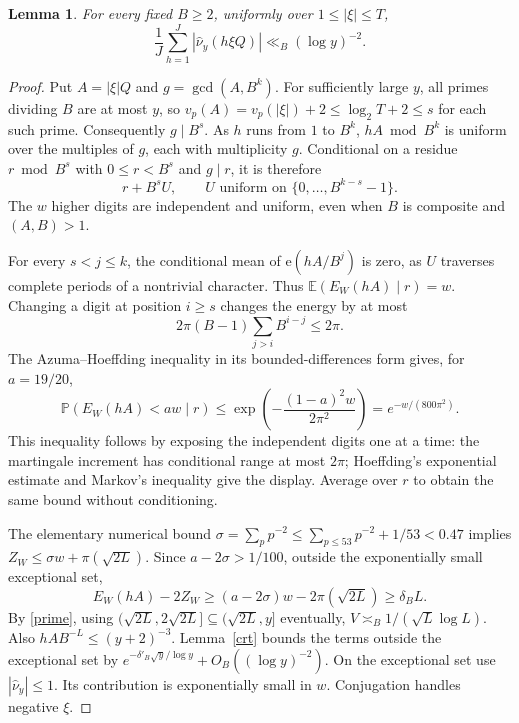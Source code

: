 \documentclass[11pt]{article}
\newtheorem{lemma}{Lemma}
\newcommand{\ee}{\mathrm e}
\newcommand{\E}{\mathbb E}
\newcommand{\PP}{\mathbb P}
\begin{document}
\begin{lemma}\label{average}
For every fixed $B\ge2$, uniformly over $1\le|\xi|\le T$,
\[
                   \frac1J\sum_{h=1}^J|\widehat\nu_y(h\xi Q)|
                                           \ll_B(\log y)^{-2}.
\]
\end{lemma}
\begin{proof}
Put $A=|\xi|Q$ and $g=\gcd(A,B^k)$.
For sufficiently large $y$, all primes dividing $B$ are at most $y$,
so $v_p(A)=v_p(|\xi|)+2\le\log_2 T+2\le s$ for each such prime.
Consequently $g\mid B^s$.
As $h$ runs from $1$ to $B^k$, $hA\bmod B^k$ is uniform over
the multiples of $g$, each with multiplicity $g$.
Conditional on a residue $r\bmod B^s$ with $0\le r<B^s$ and $g\mid r$, it is therefore
\[
           r+B^sU,\qquad U\text{ uniform on }\{0,\ldots,B^{k-s}-1\}.
\]
The $w$ higher digits are independent and uniform, even when $B$
is composite and $(A,B)>1$.

For every $s<j\le k$, the conditional mean of $\ee(hA/B^j)$ is zero,
as $U$ traverses complete periods of a nontrivial character.
Thus $\E(E_W(hA)\mid r)=w$.
Changing a digit at position $i\ge s$ changes the energy by at most
\[
                   2\pi(B-1)\sum_{j>i}B^{i-j}\le2\pi .
\]
The Azuma--Hoeffding inequality in its bounded-differences form gives,
for $a=19/20$,
\[
 \PP(E_W(hA)<aw\mid r)
       \le\exp\left(-\frac{(1-a)^2w}{2\pi^2}\right)=e^{-w/(800\pi^2)}.
\]
This inequality follows by exposing the independent digits one at a time:
the martingale increment has conditional range at most $2\pi$;
Hoeffding's exponential estimate and Markov's inequality give the display.
Average over $r$ to obtain the same bound without conditioning.

The elementary numerical bound
$\sigma=\sum_pp^{-2}\le\sum_{p\le53}p^{-2}+1/53<0.47$
implies
$Z_W\le\sigma w+\pi(\sqrt{2L})$.
Since $a-2\sigma>1/100$, outside the exponentially small exceptional set,
\[
 E_W(hA)-2Z_W\ge(a-2\sigma)w-2\pi(\sqrt{2L})\ge \delta_B L .
\]
By \eqref{prime}, using
$(\sqrt{2L},2\sqrt{2L}]\subseteq(\sqrt{2L},y]$ eventually,
$V\asymp_B1/(\sqrt L\log L)$.
Also $hA B^{-L}\le(y+2)^{-3}$.
Lemma~\ref{crt} bounds the terms outside the exceptional set by
$e^{-\delta'_B\sqrt y/\log y}+O_B((\log y)^{-2})$.
On the exceptional set use $|\widehat\nu_y|\le1$.
Its contribution is exponentially small in $w$.
Conjugation handles negative $\xi$.
\end{proof}
\end{document}
